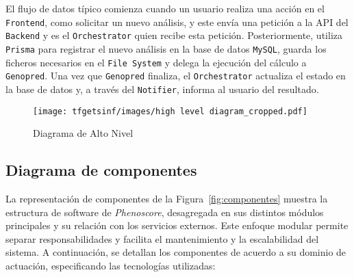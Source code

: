 \begin{itemize}
\begin{itemize}
        \end{itemize} 

\end{itemize} 

El flujo de datos típico comienza cuando un usuario realiza una acción en el \texttt{Frontend}, como solicitar un nuevo análisis, y este envía una petición a la API del \texttt{Backend} y es el \texttt{Orchestrator} quien recibe esta petición. Posteriormente, utiliza \texttt{Prisma} para registrar el nuevo análisis en la base de datos \texttt{MySQL}, guarda los ficheros necesarios en el \texttt{File System} y delega la ejecución del cálculo a \texttt{Genopred}. Una vez que \texttt{Genopred} finaliza, el \texttt{Orchestrator} actualiza el estado en la base de datos y, a través del \texttt{Notifier}, informa al usuario del resultado. 

\begin{figure}[H]
    \centering
    \texttt{[image: tfgetsinf/images/high level diagram\_cropped.pdf]}
    \caption{Diagrama de Alto Nivel}
    \label{fig:highlevel}
\end{figure}


\subsection{Diagrama de componentes}

La representación de componentes de la Figura~\ref{fig:componentes} muestra la estructura de software de \textit{Phenoscore}, desagregada en sus distintos módulos principales y su relación con los servicios externos. Este enfoque modular permite separar responsabilidades y facilita el mantenimiento y la escalabilidad del sistema. A continuación, se detallan los componentes de acuerdo a su dominio de actuación, especificando las tecnologías utilizadas:

